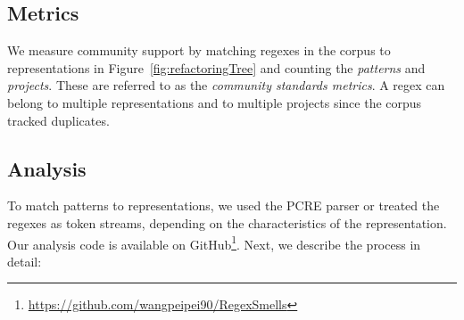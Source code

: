 \subsection{Metrics}
\label{sec:communitymetric}
We measure community support by matching regexes in the corpus to representations in Figure~\ref{fig:refactoringTree} and counting the \emph{patterns} and \emph{projects}. These are referred to as the \emph{community standards metrics}.
A regex can belong to multiple representations and to multiple projects since the corpus tracked duplicates.

%
%






\subsection{Analysis}
\label{communityanalysis}
To match patterns to representations, we used the PCRE parser or treated the regexes as token streams, depending on the characteristics of the representation. Our analysis code is available on GitHub\footnote{\url{https://github.com/wangpeipei90/RegexSmells}}.
Next, we describe the process in detail:

